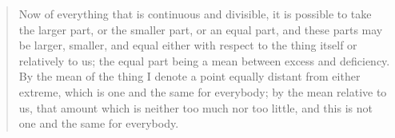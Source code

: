 \FloatBarrier
\label{sec:ageharmonic}
\begin{singlespace}
\begin{quote}
Now of everything that is continuous and divisible, it is possible to take the larger 
part, or the smaller part, or an equal part, and these parts may be larger, smaller, 
and equal either with respect to the thing itself or relatively to us; the equal part
 being a mean between excess and deficiency. By the mean of the thing I denote a point 
 equally distant from either extreme, which is one and the same for everybody; by the 
 mean relative to us, that amount which is neither too much nor too little, and this 
 is not one and the same for everybody.
\end{quote}
\end{singlespace}

